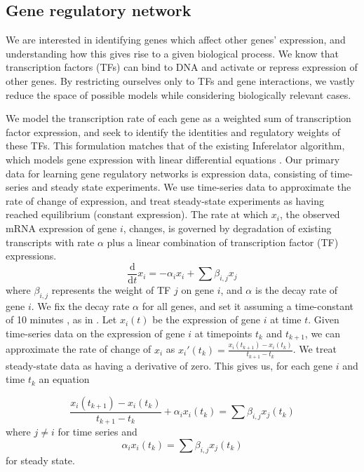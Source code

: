 \documentclass[11pt]{article}
\begin{document}
\subsection{Gene regulatory network}

We are interested in identifying genes which affect other genes' expression, and understanding how this gives rise to a given biological process. We know that transcription factors (TFs) can bind to DNA and activate or repress expression of other genes. By restricting ourselves only to TFs and gene interactions, we vastly reduce the space of possible models while considering biologically relevant cases. 

We model the transcription rate of each gene as a weighted sum of transcription factor expression, and seek to identify the identities and regulatory weights of these TFs. This formulation matches that of the existing Inferelator algorithm, which models gene expression with linear differential equations \cite{bonneau_inferelator:_2006-1}. Our primary data for learning gene regulatory networks is expression data, consisting of time-series and steady state experiments. We use time-series data to approximate the rate of change of expression, and treat steady-state experiments as having reached equilibrium (constant expression). The rate at which $x_{i}$, the observed mRNA expression of gene $i$, changes, is governed by degradation of existing transcripts with rate $\alpha$ plus a linear combination of transcription factor (TF) expressions. 
\begin{equation}
\frac{\mathrm d}{\mathrm d t} x_i = -\alpha_{i}x_{i} + \sum \beta_{i,j}x_{j}
\end{equation}
where $\beta_{i,j}$ represents the weight of TF $j$ on gene $i$, and $\alpha$ is the decay rate of gene $i$. We fix the decay rate $\alpha$ for all genes, and set it assuming a time-constant of 10 minutes \cite{hambraeus_genome-wide_2003, selinger_global_2003}, as in \cite{greenfield_robust_2013}. Let $x_i(t)$ be the expression of gene $i$ at time $t$. Given time-series data on the expression of gene $i$ at timepoints $t_k$ and $t_{k+1}$, we can approximate the rate of change of $x_i$ as $x_i'(t_k)=\frac{x_i(t_{k+1})-x_i(t_k)}{t_{k+1}-t_k}$. We treat steady-state data as having a derivative of zero. This gives us, for each gene $i$ and time $t_{k}$ an equation

\begin{equation}
\frac{x_i(t_{k+1})-x_i(t_k)}{t_{k+1}-t_k} + \alpha_{i}x_{i}(t_k)= \sum \beta_{i,j}x_{j}(t_k)
\end{equation}
where $j \neq i$ 
for time series and 
\begin{equation}
\alpha_{i}x_{i}(t_k) = \sum \beta_{i,j}x_{j}(t_k)
\end{equation}
for steady state. 
\end{document}
